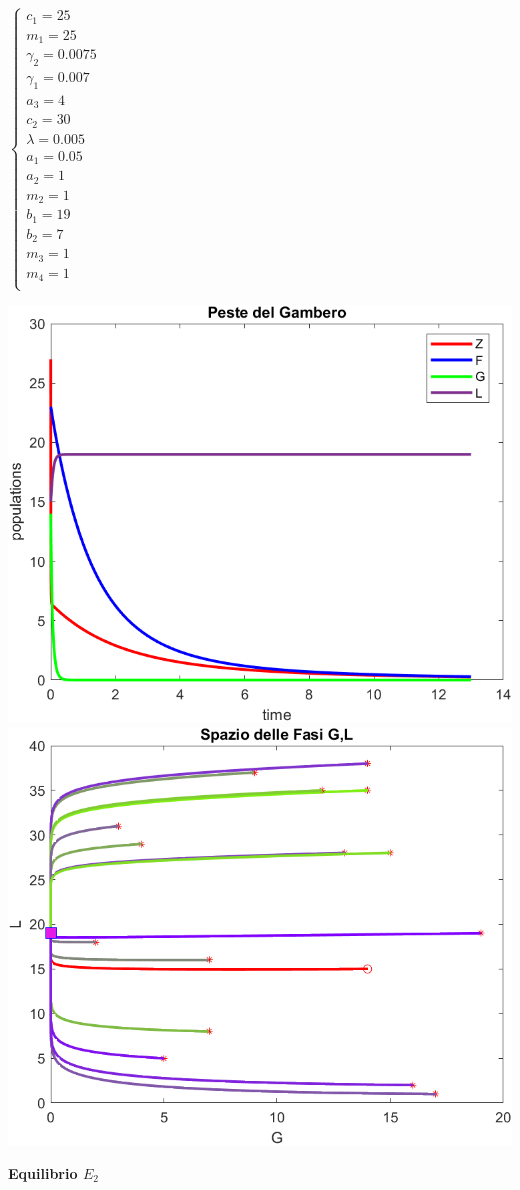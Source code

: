 \documentclass[12pt,a4paper]{article}
\numberwithin{theorem}{section}
\numberwithin{definition}{section}
\numberwithin{example}{section}
\newcommand{\deftitle}[1]{{\color{red}\bf{#1}\color{black}}}
\begin{document}
\begin{minipage}{0.2\textwidth}

$\begin{cases}
	c_1=25\\
	m_1=25\\
	\gamma_2=0.0075\\
	\gamma_1=0.007\\
	a_3=4\\
	c_2=30\\
	\lambda=0.005\\ %
	a_1=0.05\\
	a_2=1\\
	m_2=1\\
	b_1=19\\
	b_2=7\\
	m_3=1\\
	m_4=1\\
\end{cases}$ 
\end{minipage}
\begin{minipage}{0.7\textwidth}
    \centering
    \includegraphics[width=6 cm]{grafici/E1_fasi.png} 
    \\
    \includegraphics[width=6 cm]{grafici/E1_ritratto.png}
    \label{fig}
\end{minipage}

\vspace{1 cm}

\deftitle{Equilibrio $E_2$}
\end{document}
